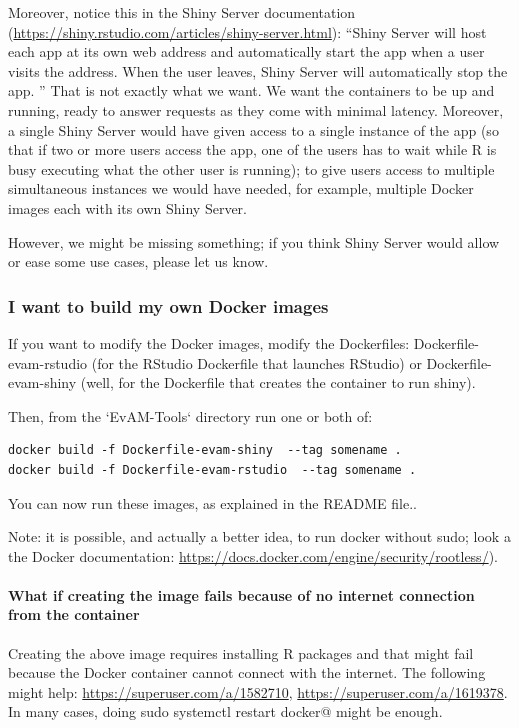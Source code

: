 \documentclass[a4paper,11pt]{article}
\begin{document}
Moreover, notice this in the Shiny Server documentation (\url{https://shiny.rstudio.com/articles/shiny-server.html}): ``Shiny Server will host each app at its own web address and automatically start the app when a user visits the address. When the user leaves, Shiny Server will automatically stop the app. ''  That is not exactly what we want. We want the containers to be up and running, ready to answer requests as they come with minimal latency. Moreover, a single Shiny Server would have given access to a single instance of the app (so that if two or more users access the app, one of the users has to wait while R is busy executing what the other user is running); to give users access to multiple simultaneous instances we would have needed, for example, multiple Docker images each with its own Shiny Server.

However, we might be missing something; if you think Shiny Server would allow or ease some use cases, please let us know.




\subsubsection{I want to build my own Docker images}

If you want to modify the Docker images, modify the Dockerfiles: Dockerfile-evam-rstudio (for the RStudio Dockerfile that launches RStudio) or Dockerfile-evam-shiny (well, for the Dockerfile that creates the container to run shiny). 


Then, from the `EvAM-Tools` directory run one or both of:

\begin{verbatim}
docker build -f Dockerfile-evam-shiny  --tag somename .
docker build -f Dockerfile-evam-rstudio  --tag somename .
\end{verbatim}


You can now run these images, as explained in the README file..

Note: it is possible, and actually a better idea, to run docker without sudo; look a the Docker documentation:
\url{https://docs.docker.com/engine/security/rootless/}).


\paragraph{What if creating the image fails because of no internet connection from the container}
Creating the above image requires installing R packages and that might fail because the Docker container cannot connect with the internet. The following might help: \url{https://superuser.com/a/1582710}, \url{https://superuser.com/a/1619378}. In many cases, doing
\verb@ sudo systemctl restart docker@ might be enough.
\end{document}
